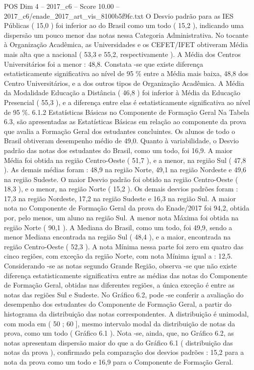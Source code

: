 \begin{textsample}{POS Dim 4 – 2017\_c6 – Score 10.00 – 2017\_c6/enade\_2017\_art\_vis\_8100b5f9fc.txt}
O Desvio padrão para as IES Públicas ( 15,0 ) foi inferior ao do Brasil como um todo ( 15,2 ), indicando uma dispersão um pouco menor das notas nessa Categoria Administrativa.
No tocante à Organização Acadêmica, as Universidades e os CEFET/IFET obtiveram Média mais alta que a nacional ( 53,3 e 55,2, respectivamente ).
A Média dos Centros Universitários foi a menor : 48,8.
Constata -se que existe diferença estatisticamente significativa ao nível de 95 \% entre a Média mais baixa, 48,8 dos Centro Universitários, e a dos outros tipos de Organização Acadêmica.
A Média da Modalidade Educação a Distância ( 46,8 ) foi inferior à Média da Educação Presencial ( 55,3 ), e a diferença entre elas é estatisticamente significativa ao nível de 95 \%. 6.1.2 Estatísticas Básicas no Componente de Formação Geral Na Tabela 6.3, são apresentadas as Estatísticas Básicas em relação ao componente da prova que avalia a Formação Geral dos estudantes concluintes.
Os alunos de todo o Brasil obtiveram desempenho médio de 49,0.
Quanto à variabilidade, o Desvio padrão das notas dos estudantes do Brasil, como um todo, foi 16,9.
A maior Média foi obtida na região Centro-Oeste ( 51,7 ), e a menor, na região Sul ( 47,8 ).
As demais médias foram : 48,9 na região Norte, 49,1 na região Nordeste e 49,6 na região Sudeste.
O maior Desvio padrão foi obtido na região Centro-Oeste ( 18,3 ), e o menor, na região Norte ( 15,2 ).
Os demais desvios padrões foram : 17,3 na região Nordeste, 17,2 na região Sudeste e 16,3 na região Sul.
A maior nota no Componente de Formação Geral da prova do Enade/2017 foi 94,2, obtida por, pelo menos, um aluno na região Sul.
A menor nota Máxima foi obtida na região Norte ( 90,1 ).
A Mediana do Brasil, como um todo, foi 49,9, sendo a menor Mediana encontrada na região Sul ( 48,4 ), e a maior, encontrada na região Centro-Oeste ( 52,3 ).
A nota Mínima nessa parte foi zero em quatro das cinco regiões, com exceção da região Norte, com nota Mínima igual a : 12,5.
Considerando -se as notas segundo Grande Região, observa -se que não existe diferença estatisticamente significativa entre as médias das notas do Componente de Formação Geral, obtidas nas diferentes regiões, a única exceção é entre as notas das regiões Sul e Sudeste.
No Gráfico 6.2, pode -se conferir a avaliação do desempenho dos estudantes do Componente de Formação Geral, a partir do histograma da distribuição das notas correspondentes.
A distribuição é unimodal, com moda em ( 50 ; 60 ], mesmo intervalo modal da distribuição de notas da prova, como um todo ( Gráfico 6.1 ).
Nota -se, ainda, que, no Gráfico 6.2, as notas apresentam dispersão maior do que a do Gráfico 6.1 ( distribuição das notas da prova ), confirmado pela comparação dos desvios padrões : 15,2 para a nota da prova como um todo e 16,9 para o Componente de Formação Geral.

\end{textsample}
